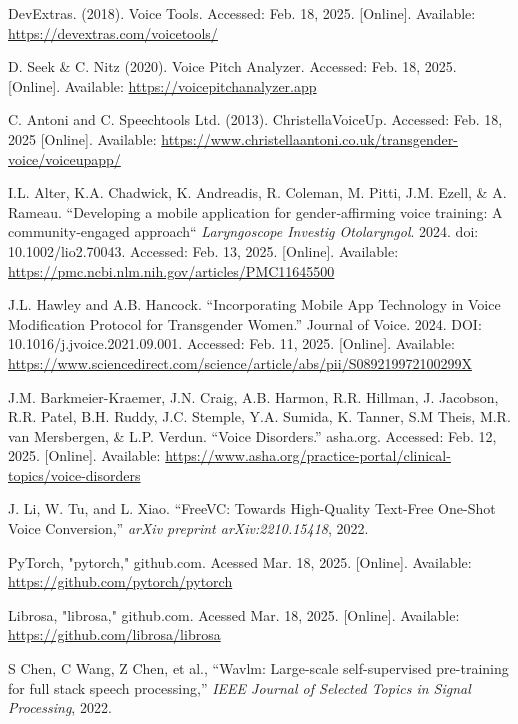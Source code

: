 \documentclass{article}
\begin{document}
%
\begin{thebibliography}{citations}

DevExtras. (2018). Voice Tools. Accessed: Feb. 18, 2025. [Online]. Available: \url{https://devextras.com/voicetools/}

D. Seek \& C. Nitz (2020). Voice Pitch Analyzer. Accessed: Feb. 18, 2025. [Online]. Available: \url{https://voicepitchanalyzer.app}

C. Antoni and C. Speechtools Ltd. (2013). ChristellaVoiceUp. Accessed: Feb. 18, 2025 [Online]. Available: \url{https://www.christellaantoni.co.uk/transgender-voice/voiceupapp/}

I.L. Alter, K.A. Chadwick, K. Andreadis, R. Coleman, M. Pitti, J.M. Ezell, & A. Rameau. “Developing a mobile application for gender‐affirming voice training: A community‐engaged approach“ \textit{Laryngoscope Investig Otolaryngol}. 2024. doi: 10.1002/lio2.70043. Accessed: Feb. 13, 2025. [Online]. Available: \url{https://pmc.ncbi.nlm.nih.gov/articles/PMC11645500}

J.L. Hawley and A.B. Hancock. “Incorporating Mobile App Technology in Voice Modification Protocol for Transgender Women.” Journal of Voice. 2024. DOI: 10.1016/j.jvoice.2021.09.001. Accessed: Feb. 11, 2025. [Online]. Available:
\url{https://www.sciencedirect.com/science/article/abs/pii/S089219972100299X}

J.M. Barkmeier-Kraemer, J.N. Craig, A.B. Harmon, R.R. Hillman, J. Jacobson, R.R. Patel, B.H. Ruddy, J.C. Stemple, Y.A. Sumida, K. Tanner, S.M Theis, M.R. van Mersbergen, \& L.P. Verdun. “Voice Disorders.” asha.org. Accessed: Feb. 12, 2025. [Online]. Available: \url{https://www.asha.org/practice-portal/clinical-topics/voice-disorders}

J. Li, W. Tu, and L. Xiao. “FreeVC: Towards High-Quality Text-Free One-Shot Voice Conversion,” \textit{arXiv preprint arXiv:2210.15418}, 2022.

PyTorch, "pytorch," github.com. Acessed Mar. 18, 2025. [Online]. Available: \url{https://github.com/pytorch/pytorch}

Librosa, "librosa," github.com. Acessed Mar. 18, 2025. [Online]. Available: \url{https://github.com/librosa/librosa}

S Chen, C Wang, Z Chen, et al., “Wavlm: Large-scale self-supervised pre-training for full stack speech processing,” \textit{IEEE Journal of Selected Topics in Signal Processing}, 2022.


\end{thebibliography}
\end{document}
